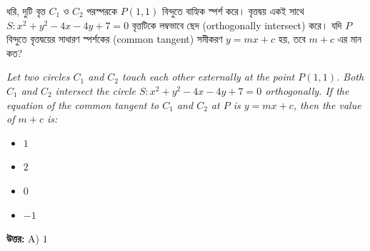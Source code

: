 \documentclass[12pt, a4paper]{article}
\begin{document}
\begin{tcolorbox}[questionbox={প্রশ্ন (Question) 12}]
    \noindent
    ধরি, দুটি বৃত্ত $C_1$ ও $C_2$ পরস্পরকে $P(1, 1)$ বিন্দুতে বাহ্যিক স্পর্শ করে। বৃত্তদ্বয় একই সাথে $S: x^2 + y^2 - 4x - 4y + 7 = 0$ বৃত্তটিকে লম্বভাবে ছেদ (orthogonally intersect) করে। যদি $P$ বিন্দুতে বৃত্তদ্বয়ের সাধারণ স্পর্শকের (common tangent) সমীকরণ $y = mx + c$ হয়, তবে $m + c$ এর মান কত?
    
    \vspace{0.8em}
    \begin{english}
    \noindent\textit{\color{darkgray}
    Let two circles $C_1$ and $C_2$ touch each other externally at the point $P(1, 1)$. Both $C_1$ and $C_2$ intersect the circle $S: x^2 + y^2 - 4x - 4y + 7 = 0$ orthogonally. If the equation of the common tangent to $C_1$ and $C_2$ at $P$ is $y = mx + c$, then the value of $m + c$ is:
    }
    \end{english}
\end{tcolorbox}

\begin{itemize}[label={}, leftmargin=1cm, itemsep=0.5em]
    \item[\textbf{A)}] $1$
    \item[\textbf{B)}] $2$
    \item[\textbf{C)}] $0$
    \item[\textbf{D)}] $-1$
\end{itemize}

\vspace{0.5em}
\begin{tcolorbox}[answerbox]
    \textbf{\color{success} উত্তর:} A) $1$
\end{tcolorbox}
\vspace{1em}
\end{document}
